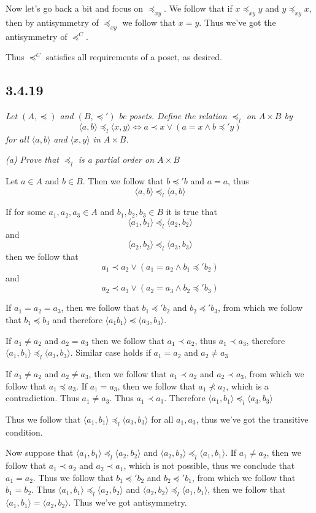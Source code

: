 \documentclass[11pt,oneside,titlepage]{book}
\newcommand{\eangle}[1]{\langle #1 \rangle}
\begin{document}
Now let's go back a bit and focus on $\preceq_{xy}$. We follow that if $x \preceq_{xy} y$
and $y \preceq_{xy} x$, then by antisymmetry of $\preceq_{xy}$ we follow that $x = y$. Thus
we've got the antisymmetry of $\preceq^C$.

Thus $\preceq^C$ satisfies all requirements of a poset, as desired.

\subsection*{3.4.19}

\textit{Let $(A, \preceq)$ and $(B, \preceq')$ be posets. Define the relation $\preceq_l$ on
  $A \times B$ by
  $$ \eangle{a, b} \preceq_l \eangle{x, y} \iff a \prec x \lor (a = x \land b \preceq' y) $$
  for all $\eangle{a, b}$ and $\eangle{x, y}$ in $A \times B$. }

\textit{(a) Prove that $\preceq_l$ is a partial order on $A \times B$}

Let $a \in A$ and $b \in B$. Then we follow that $b \preceq' b$ and $a = a$, thus
$$\eangle{a, b} \preceq_l \eangle{a, b}$$

If for some $a_1, a_2, a_3 \in A$ and $b_1, b_2, b_3 \in B$ it is true that
$$\eangle{a_1, b_1} \preceq_l \eangle{a_2, b_2}$$
and
$$ \eangle{a_2, b_2} \preceq_l \eangle{a_3, b_3} $$
then we follow that
$$a_1 \prec a_2 \lor (a_1 = a_2 \land b_1 \preceq' b_2)$$
and
$$a_2 \prec a_3 \lor (a_2 = a_3 \land b_2 \preceq' b_3)$$

If $a_1 = a_2 = a_3$, then we follow that $b_1 \preceq' b_2$ and $b_2 \preceq' b_3$, from which
we follow that $b_1 \preceq b_3$ and therefore $\eangle{a_1 b_1} \preceq \eangle{a_3, b_3}$.

If $a_1 \neq a_2$ and $a_2 = a_3$ then we follow that $a_1 \prec a_2$, thus $a_1 \prec a_3$,
therefore $\eangle{a_1, b_1} \preceq_l \eangle{a_3, b_3}$. Similar case holds if
$a_1 = a_2$ and $a_2 \neq a_3$

If $a_1 \neq a_2$ and $a_2 \neq a_3$, then we follow that $a_1 \prec a_2$ and $a_2 \prec a_3$,
from which we follow that $a_1 \preceq a_3$. If $a_1 = a_3$, then we follow that
$a_1 \not \prec a_2$, which is a contradiction. Thus $a_1 \neq a_3$. Thus $a_1 \prec a_3$.
Therefore $\eangle{a_1, b_1} \preceq_l \eangle{a_3, b_3}$

Thus we follow that $\eangle{a_1, b_1} \preceq_l \eangle{a_3, b_3}$ for all $a_1, a_3$, thus
we've got the transitive condition.

Now suppose that $\eangle{a_1, b_1} \preceq_l \eangle{a_2, b_2}$ and
$\eangle{a_2, b_2} \preceq_l \eangle{a_1, b_1}$. If $a_1 \neq a_2$, then we follow that
$a_1 \prec a_2$ and $a_2 \prec a_1$, which is not possible, thus we conclude that $a_1 = a_2$.
Thus we follow that $b_1 \preceq' b_2$ and $b_2 \preceq' b_1$, from which we follow that
$b_1 = b_2$. Thus $\eangle{a_1, b_1} \preceq_l \eangle{a_2, b_2}$ and
$\eangle{a_2, b_2} \preceq_l \eangle{a_1, b_1}$, then we follow that
$\eangle{a_1, b_1} = \eangle{a_2, b_2}$. Thus we've got antisymmetry.
\end{document}
